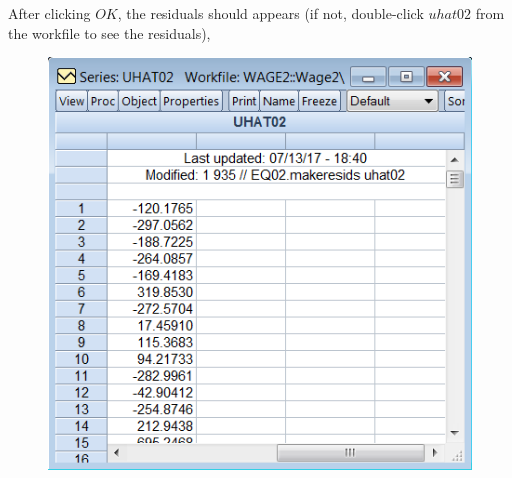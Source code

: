 \documentclass[12pt]{report}
\begin{document}
\vspace{-\baselineskip}
\noindent After clicking $OK$, the residuals should appears (if not, double-click $uhat02$ from the workfile to see the residuals),
\begin{figure}[H]
	\centering
	\includegraphics{q3_27}
\end{figure}
\end{document}

